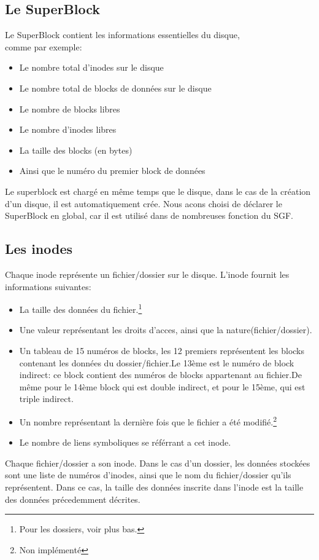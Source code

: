 \documentclass{report}
\begin{document}
\subsection*{Le SuperBlock}
Le SuperBlock contient les informations essentielles du disque,\\comme par exemple: 
\begin{itemize}
\item Le nombre total d'inodes sur le disque
\item Le nombre total de blocks de données sur le disque
\item Le nombre de blocks libres
\item Le nombre d'inodes libres
\item La taille des blocks (en bytes)
\item Ainsi que le numéro du premier block de données
\end{itemize}
Le superblock est chargé en même temps que le disque, dans le cas de la création d'un disque, il est automatiquement crée. Nous acons choisi de déclarer le SuperBlock en global, car il est utilisé dans de nombreuses fonction du SGF.
\subsection*{Les inodes}
Chaque inode représente un fichier/dossier sur le disque. L'inode fournit les informations suivantes:
\begin{itemize}
    \item La taille des données du fichier.\footnote{Pour les dossiers, voir plus bas.}
    \item Une valeur représentant les droits d'acces, ainsi que la nature(fichier/dossier).
    \item Un tableau de 15 numéros de blocks, les 12 premiers représentent les blocks contenant les données du dossier/fichier.Le 13ème est le numéro de block indirect: ce block contient des numéros de blocks appartenant au fichier.De même pour le 14ème block qui est double indirect, et pour le 15ème, qui est triple indirect.
    \item Un nombre représentant la dernière fois que le fichier a été modifié.\footnote{Non implémenté}
    \item Le nombre de liens symboliques se référrant a cet inode.
\end{itemize}
Chaque fichier/dossier a son inode. Dans le cas d'un dossier, les données stockées sont une liste de numéros d'inodes, ainsi que le nom du fichier/dossier qu'ils représentent. Dans ce cas, la taille des données inscrite dans l'inode est la taille des données précedemment décrites.
\end{document}
